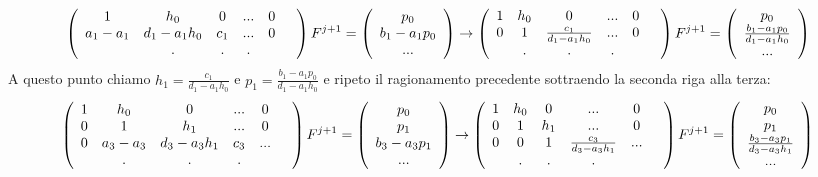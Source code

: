 \begin{equation}
  \left( \begin{array}{cccccc}
      1&h_0&0&...&0\\
      a_1-a_1 &d_1 -a_1 h_0&c_1&...&0\\
      &.&.&.&&\\
  \end{array} \right) F^{j+1} = \left( \begin{array}{c}
      p_0\\b_1-a_1p_0\\...
  \end{array} \right)\to
  \left( \begin{array}{cccccc}
      1&h_0&0&...&0\\
      0 &1&\frac{c_1}{d_1 -a_1 h_0}&...&0\\
      &.&.&.&&\\
  \end{array} \right) F^{j+1} = \left( \begin{array}{c}
      p_0\\\frac{b_1-a_1p_0}{d_1 -a_1 h_0}\\...
  \end{array} \right)
\end{equation}
A questo punto chiamo $h_1 = \frac{c_1}{d_1 -a_1 h_0}$ e $p_1=\frac{b_1-a_1p_0}{d_1 -a_1 h_0}$ e ripeto il ragionamento precedente sottraendo la seconda riga alla terza:
\begin{equation}
  \left( \begin{array}{cccccc}
      1&h_0&0&...&0\\
      0 &1&h_1&...&0\\
      0&a_3-a_3&d_3-a_3 h_1&c_3&...\\
      &.&.&.&&\\
  \end{array} \right) F^{j+1} = \left( \begin{array}{c}
      p_0\\p_1\\b_3 -a_3 p_1\\...
  \end{array} \right) \to
  \left( \begin{array}{cccccc}
      1&h_0&0&...&0\\
      0 &1&h_1&...&0\\
      0&0&1&\frac{c_3}{d_3-a_3 h_1}&...\\
      &.&.&.&&\\
  \end{array} \right) F^{j+1} = \left( \begin{array}{c}
      p_0\\p_1\\\frac{b_3 -a_3 p_1}{d_3-a_3 h_1}\\...
  \end{array} \right)
\end{equation}
